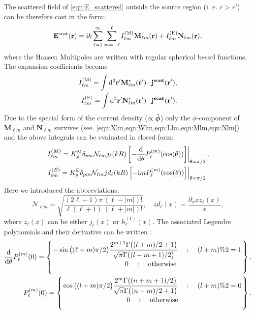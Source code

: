 The scattered field of \cref{eqn:E_scattered} outside the source region (i. e. $r>r'$) can be therefore cast in the form:
\begin{equation}
\mathbf{E}^\text{scat}(\mathbf{r}) = \mathrm{i} k \sum_{\ell=1}^\infty  \sum_{m=-\ell}^\ell
I_{\ell m}^\mathrm{(M)}\mathbf{M}_{\ell m}(\mathbf{r})+
I_{\ell m}^\mathrm{(E)}\mathbf{N}_{\ell m}(\mathbf{r}),
\label{eqn:Escat}
\end{equation}
where the Hansen Multipoles are written with regular spherical bessel functions. The expansion coefficients become
\begin{align}
I_{\ell m}^\text{(M)} = \int \mathrm{d}^3\mathbf{r}' \mathbf{M}^*_{\ell m}(\mathbf{r}')\cdot
\mathbf{j}^\textbf{scat}(\mathbf{r}'),\\
I_{\ell m}^\text{(E)} = \int \mathrm{d}^3\mathbf{r}' \mathbf{N}^*_{\ell m}(\mathbf{r}')\cdot
\mathbf{j}^\textbf{scat}(\mathbf{r}').
\end{align}
Due to the special form of the current density ($\propto \hat{\bm{\phi}}$) only the $\phi$-component of $\mathbf{M}_{\ell m}$ and $\mathbf{N}_{\ell m}$ survives (see. \cref{eqn:Xlm,eqn:Wlm,eqn:Llm,eqn:Mlm,eqn:Nlm}) and the above integrals can be evaluated in closed form:
\begin{align}
\left.I_{\ell m}^{(M)} = K^\mathrm{M}_{p}\delta_{p m} \mathcal{N}_{\ell m} j_\ell(kR)\left[-\frac{\displaystyle\mathrm{d}}{\mathrm{d} \theta}P_{\ell}^{(m)}(\cos(\theta))
\right]\right \vert_{\theta=\pi/2},\\
\left.I_{\ell m}^{(E)} =  K^\mathrm{E}_{p} \delta_{p m} \mathcal{N}_{\ell m}jd_\ell(kR)
\left[-\mathrm{i} m 
P_\ell^{(m)}(\cos(\theta)) \right]\right\vert_{\theta=\pi/2}.
\end{align}
Here we introduced the abbreviations:
\begin{equation}
\mathcal{N}_{\ell m} = \sqrt{\frac{(2\ell+1)\pi}{\ell(\ell+1)}\frac{(\ell-|m|)!}{(\ell+|m|)!}},\quad
zd_\ell(x) = \frac{\partial_{x}  x z_\ell(x)}{x},
\end{equation}
where $z_\ell(x)$ can be either $j_\ell(x)$ or $h_\ell^{(1)}(x)$.
The associated Legendre polynomials and their derivative can be written \Cite{Leong1997}:
\begin{align}
\frac{\rd}{\rd \theta}P_\ell^{(m)}(0) =\left\{\ontop{}{}{
-\sin\big((\ell+m)\pi/2\big)\dfrac{2^{m+1}\Gamma\big((l+m)/2+1\big)}{\sqrt{\pi}\Gamma\big((l-m+1)/2\big) }
\quad : \quad (l+m)\%2=1}{\quad0\quad: \quad\text{otherwise}}\right\},
\label{eqn:Plm0diff}
\\
P_\ell^{(m)}(0) =
\left\{
\ontop{}{}{\cos\big((l+m)\pi/2\big)\dfrac{2^m \Gamma\big((n+m+1)/2\big)}{\sqrt{\pi}\Gamma\big((n-m)/2+1\big)}\quad:\quad (l+m)\%2=0}{0\quad:\quad \text{otherwise}}\right\}.
\label{eqn:Plm0}
\end{align}
